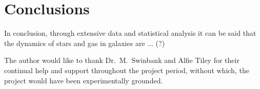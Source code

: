 \documentclass[12pt, twocolumn]{revtex4}    %
\begin{document}
\section{Conclusions}
 
In conclusion, through extensive data and statistical analysis it can be said that the dynamics of stars and gas in galaxies are ... (?) 

\begin{acknowledgments}
The author would like to thank Dr.~M.~Swinbank and Alfie Tiley for their continual help and support throughout the project period, without which, the project would have been experimentally grounded.
\end{acknowledgments}



\end{document}
